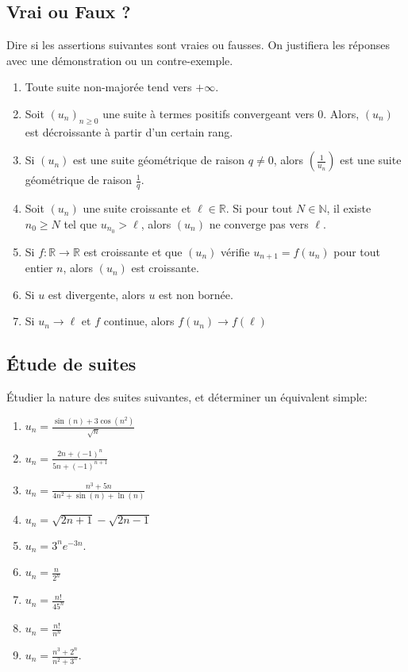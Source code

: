 \vspace{1em}

\newpage
  \subsection{Vrai ou Faux ?}
  Dire si les assertions suivantes sont vraies ou fausses. On justifiera les réponses avec une démonstration ou un contre-exemple.
  \begin{enumerate}[label = $\square$]
    \item Toute suite non-majorée tend vers $+\infty$.
    \item Soit $\left(u_n\right)_{n \geq 0}$ une suite à termes positifs convergeant vers $0$. Alors, $(u_n)$ est décroissante à partir d'un certain rang.
    \item Si $(u_n)$ est une suite géométrique de raison $q \neq 0$, alors $\left(\frac{1}{u_n}\right)$ est une suite géométrique de raison $\frac{1}{q}$.
    \item Soit $(u_n)$ une suite croissante et $\ell \in \mathbb{R}$. Si pour tout $N \in \mathbb{N}$, il existe $n_0 \geq N$ tel que $u_{n_0} > \ell$, alors $(u_n)$ ne converge pas vers $\ell$.
    \item Si $f: \mathbb{R} \rightarrow \mathbb{R}$ est croissante et que $(u_n)$ vérifie $u_{n+1}=f\left(u_n\right)$ pour tout entier $n$,  alors $(u_n)$ est croissante.
    \item Si $u$ est divergente, alors $u$ est non bornée.
    \item Si $u_n\to \ell$ et $f$ continue, alors $f(u_n)\to f(\ell)$
  \end{enumerate}

  \vspace{1em}


  \subsection{Étude de suites}
  Étudier la nature des suites suivantes, et déterminer un équivalent simple:
  \begin{multicols}{3}
  \begin{enumerate}[label = \alph*), itemsep = 0.5em]
    \item $\displaystyle u_n=\frac{\sin (n)+3 \cos \left(n^2\right)}{\sqrt{n}}$
    \item $\displaystyle u_n=\frac{2 n+(-1)^n}{5 n+(-1)^{n+1}}$
    \item $\displaystyle u_n=\frac{n^3+5 n}{4 n^2+\sin (n)+\ln (n)}$
    \item $\displaystyle u_n=\sqrt{2 n+1}-\sqrt{2 n-1}$
    \item $\displaystyle u_n=3^n e^{-3 n}$.
    \item $\displaystyle u_n=\frac{n}{2^n}$
    \item $\displaystyle u_n=\frac{n!}{45^n}$
    \item $\displaystyle u_n=\frac{n!}{n^n}$
    \item $\displaystyle u_n=\frac{n^3+2^n}{n^2+3^n}$.
  \end{enumerate}
  \end{multicols}


